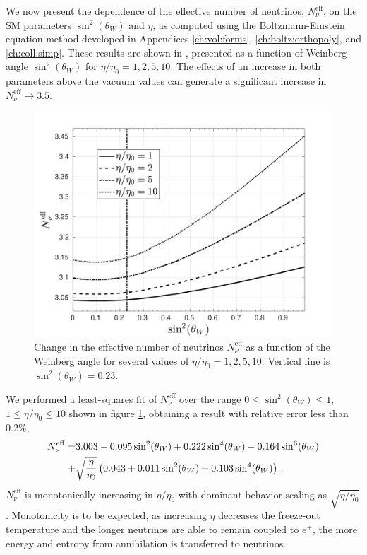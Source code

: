 We now present the dependence of the effective number of neutrinos, $N_\nu^{\mathrm{eff}}$, on the SM parameters $\sin^2(\theta_W)$ and $\eta$, as computed using the Boltzmann-Einstein equation method developed in Appendices \ref{ch:vol:forms}, \ref{ch:boltz:orthopoly}, and \ref{ch:coll:simp}. These results are shown in , presented as a function of Weinberg angle $\sin^2(\theta_W) $ for $\eta/\eta_0=1,2,5,10$. The effects of an increase in both parameters above the vacuum values can generate a significant increase in $N_\nu^{\mathrm{eff}}\to 3.5$.
\begin{figure}
\centerline{\includegraphics[width=0.80\linewidth]{plots/N_eff2.pdf}}
\caption{Change in the effective number of neutrinos $N_\nu^{\mathrm{eff}}$ as a function of the Weinberg angle for several values of $\eta/\eta_0=1,2,5,10$. Vertical line is $\sin^2(\theta_W)=0.23$. }
\label{NnuParams} 
 \end{figure}

We performed a least-squares fit of $N_\nu^{\mathrm{eff}}$ over the range $0\leq \sin^2(\theta_W)\leq 1$, $1\leq \eta/\eta_0\leq 10$ shown in figure \ref{NnuParams}, obtaining a result with relative error less than $0.2\%$,
\begin{align}
N_\nu^{\mathrm{eff}}=&3.003-0.095\sin^2(\theta_W) +0.222\sin^4(\theta_W ) -0.164\sin^6(\theta_W )\notag\\
+&\sqrt{\frac{\eta}{\eta_0}}\left(0.043+0.011\sin^2(\theta_W) +0.103\sin^4(\theta_W)\right)\,.
\end{align}
$N_\nu^{\mathrm{eff}}$ is monotonically increasing in $\eta/\eta_0$ with dominant behavior scaling as $\sqrt{ \eta/\eta_0}$. Monotonicity is to be expected, as increasing $\eta$ decreases the freeze-out temperature and the longer neutrinos are able to remain coupled to $e^\pm$, the more energy and entropy from annihilation is transferred to neutrinos.


